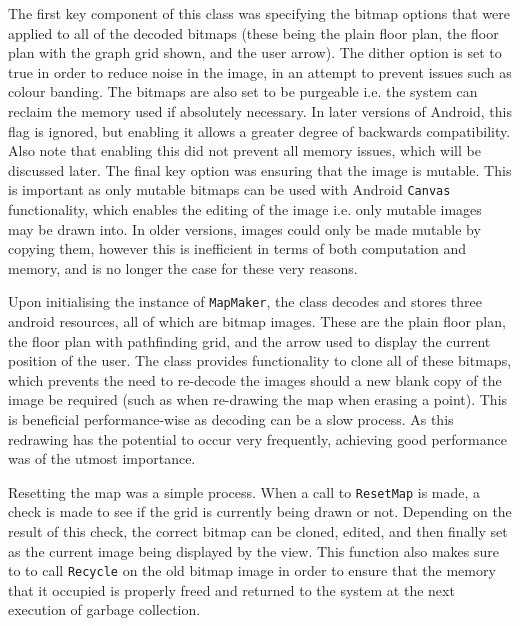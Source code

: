 \documentclass[main.tex]{subfiles}
\begin{document}
                    The first key component of this class was specifying the bitmap options that were applied to all of the decoded bitmaps (these being the plain floor plan,
                    the floor plan with the graph grid shown, and the user arrow).
                    The dither option is set to true in order to reduce noise in the image, in an attempt to prevent issues such as colour
                    banding. The bitmaps are also set to be purgeable i.e. the system can reclaim the memory used if absolutely necessary. In later versions of Android, this flag
                    is ignored, but enabling it allows a greater degree of backwards compatibility. Also note that enabling this did not prevent all memory issues, which will be discussed
                    later. The final key option was ensuring that the image is mutable. This is important as only mutable bitmaps can be used with Android
                    \texttt{Canvas} functionality, which enables the editing of the image i.e. only mutable images may be drawn into. In older versions, images could only be
                    made mutable by copying them, however this is inefficient in terms of both computation and memory, and is no longer the case for these very reasons.
                    
                    Upon initialising the instance of \texttt{MapMaker}, the class decodes and stores three android resources, all of which are bitmap images. These are the plain
                    floor plan, the floor plan with pathfinding grid, and the arrow used to display the current position of the user. The class provides functionality to clone
                    all of these bitmaps, which prevents the need to re-decode the images should a new blank copy of the image be required (such as when re-drawing the map
                    when erasing a point). This is beneficial performance-wise as decoding can be a slow process. As this redrawing has the potential to occur very frequently,
                    achieving good performance was of the utmost importance.
                    
                    Resetting the map was a simple process. When a call to \texttt{ResetMap} is made, a check is made to see if the grid is currently being drawn or not. Depending
                    on the result of this check, the correct bitmap can be cloned, edited, and then finally set as the current image being displayed by the view.
                    This function also makes sure to to call \texttt{Recycle} on the old bitmap image in order to ensure that the memory that it occupied is properly freed and
                    returned to the system at the next execution of garbage collection.
                    
\end{document}
